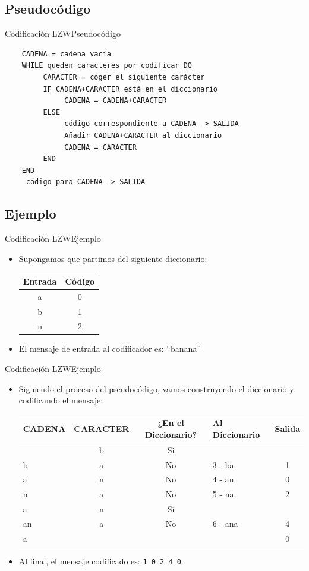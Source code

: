 \documentclass[10pt,compress]{beamer} %
\begin{document}
\subsection{Pseudocódigo}
\begin{frame}[fragile]{Codificación LZW}{Pseudocódigo}
  \footnotesize
  \begin{verbatim}
    CADENA = cadena vacía
    WHILE queden caracteres por codificar DO
         CARACTER = coger el siguiente carácter
         IF CADENA+CARACTER está en el diccionario
              CADENA = CADENA+CARACTER
         ELSE
              código correspondiente a CADENA -> SALIDA
              Añadir CADENA+CARACTER al diccionario
              CADENA = CARACTER
         END
    END
     código para CADENA -> SALIDA
  \end{verbatim}
\end{frame}

\subsection{Ejemplo}
\begin{frame}{Codificación LZW}{Ejemplo}
	\begin{itemize}
    \item Supongamos que partimos del siguiente diccionario:

    \begin{tabular}{cc}
      Entrada & Código \\
      \hline
      a & 0 \\
      b & 1 \\
      n & 2 \\
    \end{tabular}
    \item El mensaje de entrada al codificador es: ``banana''
	\end{itemize}
\end{frame}

\begin{frame}{Codificación LZW}{Ejemplo}
	\begin{itemize}
    \item Siguiendo el proceso del pseudocódigo, vamos construyendo el diccionario y codificando el mensaje:
    \begin{tabular}{lcclc}
      CADENA & CARACTER  & ¿En el Diccionario? & Al Diccionario & Salida \\
      \hline
         & b & Si &  &  \\
       b & a & No & 3 - ba & 1 \\
       a & n & No & 4 - an & 0 \\
       n & a & No & 5 - na & 2 \\
       a & n & Sí & 		&  \\
       an & a & No & 6 - ana & 4 \\
       a & & & & 0 \\ 	
      \end{tabular}
    \item Al final, el mensaje codificado es: \texttt{1 0 2 4 0}.
	\end{itemize}
\end{frame}
\end{document}
